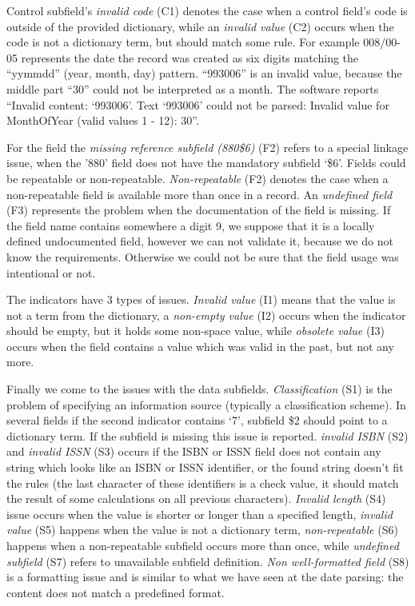 Control subfield's \emph{invalid code} (C1) denotes the case when a control field's code is outside of the provided dictionary, while an \emph{invalid value} (C2) occurs when the code is not a dictionary term, but should match some rule. For example 008/00-05 represents the date the record was created as six digits matching the ``yymmdd'' (year, month, day) pattern. ``993006'' is an invalid value, because the middle part ``30'' could not be interpreted as a month. The software reports ``Invalid content: `993006'. Text `993006' could not be parsed: Invalid value for MonthOfYear (valid values 1 - 12): 30''.

For the field the \emph{missing reference subfield (880\$6)} (F2) refers to a special linkage issue, when the '880' field does not have the mandatory subfield `\$6'. Fields could be repeatable or non-repeatable. \emph{Non-repeatable} (F2) denotes the case when a non-repeatable field is available more than once in a record. An \emph{undefined field} (F3) represents the problem when the documentation of the field is missing. If the field name contains somewhere a digit 9, we suppose that it is a locally defined undocumented field, however we can not validate it, because we do not know the requirements. Otherwise we could not be sure that the field usage was intentional or not.

The indicators have 3 types of issues. \emph{Invalid value} (I1) means that the value is not a term from the dictionary, a \emph{non-empty value} (I2) occurs when the indicator should be empty, but it holds some non-space value, while \emph{obsolete value} (I3) occurs when the field contains a value which was valid in the past, but not any more.

Finally we come to the issues with the data subfields. \emph{Classification} (S1) is the problem of specifying an information source (typically a classification scheme). In several fields if the second indicator contains `7', subfield \$2 should point to a dictionary term. If the subfield is missing this issue is reported. \emph{invalid ISBN} (S2) and \emph{invalid ISSN} (S3) occurs if the ISBN or ISSN field does not contain any string which looks like an ISBN or ISSN identifier, or the found string doesn't fit the rules (the last character of these identifiers is a check value, it should match the result of some calculations on all previous characters). \emph{Invalid length} (S4) issue occurs when the value is shorter or longer than a specified length, \emph{invalid value} (S5) happens when the value is not a dictionary term, \emph{non-repeatable} (S6) happens when a non-repeatable subfield occurs more than once, while \emph{undefined subfield} (S7) refers to unavailable subfield definition. \emph{Non well-formatted field} (S8) is a formatting issue and is similar to what we have seen at the date parsing: the content does not match a predefined format. 

